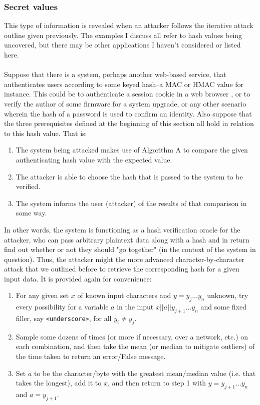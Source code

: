 \documentclass{article}
\providecommand{\tightlist}{
    \setlength{\itemsep}{0pt}\setlength{\parskip}{0pt}
}
\providecommand{\inlinecode}{\texttt}
\begin{document}
\subsubsection{Secret values}
This type of information is revealed when an attacker follows the iterative attack outline given previously. The examples I discuss all refer to hash values being uncovered, but there may be other applications I haven't considered or listed here. \\
  \\
  Suppose that there is a system, perhaps another web-based service, that authenticates users according to some keyed hash--a MAC or HMAC value for instance. This could be to authenticate a session cookie in a web browser \cite{codahale}, or to verify the author of some firmware for a system upgrade, or any other scenario wherein the hash of a password is used to confirm an identity. Also suppose that the three prerequisites defined at the beginning of this section all hold in relation to this hash value. That is:
  \begin{enumerate}\tightlist
    \item The system being attacked makes use of Algorithm A to compare the given authenticating hash value with the expected value.
    \item The attacker is able to choose the hash that is passed to the system to be verified.
    \item The system informs the user (attacker) of the results of that comparison in some way.
  \end{enumerate}
In other words, the system is functioning as a hash verification oracle for the attacker, who can pass arbitrary plaintext data along with a hash and in return find out whether or not they should "go together" (in the context of the system in question).
Thus, the attacker might the more advanced character-by-character attack that we outlined before to retrieve the corresponding hash for a given input data. It is provided again for convenience:
\begin{enumerate}\tightlist
  \item For any given set $x$ of known input characters and $y = {y_j \dots y_n}$ unknown, try every possibility for a variable $a$ in the input $x || a || y_{j+1} \dots y_n$ and some fixed filler, say \inlinecode{<underscore>}, for all $y_i \neq y_j$.
  \item Sample some dozens of times (or more if necessary, over a network, etc.) on each combination, and then take the mean (or median to mitigate outliers) of the time taken to return an error/False message.
  \item Set $a$ to be the character/byte with the greatest mean/median value (i.e. that takes the longest), add it to $x$, and then return to step 1 with $y = {y_{j+1} \dots y_n}$ and $a = y_{j+1}$.
\end{enumerate}
\end{document}
